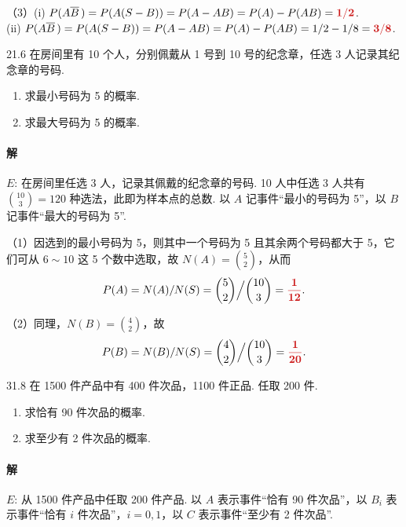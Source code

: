 \documentclass[11pt, UTF8]{ctexart}
\newcommand{\Prob}{P}
\newcommand{\comp}[1]{\overline{#1}\mskip 3mu}
\newcommand{\ans}[1]{\mathbf{\color{fred}#1}}
\begin{document}
（3）(i) $\Prob(A\comp{B}) = \Prob(A(S-B)) = \Prob(A-AB) = \Prob(A)-\Prob(AB) = \ans{1/2}$. \\
(ii) $\Prob(A\comp{B}) = \Prob(A(S-B)) = \Prob(A-AB) = \Prob(A)-\Prob(AB) = 1/2-1/8 = \ans{3/8}$.

\vspace{1.5em}

\begin{problem}{2}{1.6}
在房间里有 10 个人，分别佩戴从 1 号到 10 号的纪念章，任选 3 人记录其纪念章的号码.
\begin{enumerate}
    \item[(1)] 求最小号码为 5 的概率.
    \item[(2)] 求最大号码为 5 的概率.
\end{enumerate}
\end{problem}

\paragraph{\color{fblue}解}
$E$: 在房间里任选 3 人，记录其佩戴的纪念章的号码. 10 人中任选 3 人共有 $\binom{10}{3}=120$ 种选法，此即为样本点的总数. 以 $A$ 记事件“最小的号码为 5”，以 $B$ 记事件“最大的号码为 5”.

（1）因选到的最小号码为 5，则其中一个号码为 5 且其余两个号码都大于 5，它们可从 $6 \sim 10$ 这 5 个数中选取，故 $N(A)=\binom{5}{2}$，从而
\[ \Prob(A) = N(A)/N(S) = \binom{5}{2} \Big/ \binom{10}{3} = \ans{\frac{1}{12}}. \]

（2）同理，$N(B)=\binom{4}{2}$，故
\[ \Prob(B) = N(B)/N(S) = \binom{4}{2} \Big/ \binom{10}{3} = \ans{\frac{1}{20}}. \]

\vspace{1.5em}

\begin{problem}{3}{1.8}
在 1500 件产品中有 400 件次品，1100 件正品. 任取 200 件.
\begin{enumerate}
    \item[(1)] 求恰有 90 件次品的概率.
    \item[(2)] 求至少有 2 件次品的概率.
\end{enumerate}
\end{problem}

\paragraph{\color{fblue}解}
$E$: 从 1500 件产品中任取 200 件产品. 以 $A$ 表示事件“恰有 90 件次品”，以 $B_i$ 表示事件“恰有 $i$ 件次品”，$i=0,1$，以 $C$ 表示事件“至少有 2 件次品”.
\end{document}
